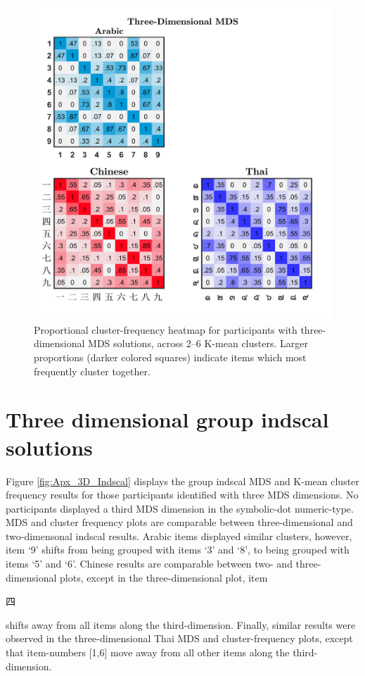 \begin{figure}[tbh]
\centering \includegraphics[scale = .7]{Figures/Appendix/AppD/3D_KM2clusterHeatmapCustom_wDots.jpg}
\caption{Proportional cluster-frequency heatmap for participants with three-dimensional MDS solutions, across 2--6 K-mean clusters. Larger proportions (darker colored squares) indicate items which most frequently cluster together.}
\label{fig:Apx_3D_MDScounts}
\end{figure}


\clearpage
\section{Three dimensional group indscal solutions}
\label{Appendix:Indscal 3D}

Figure \ref{fig:Apx_3D_Indscal} displays the group indscal MDS and K-mean cluster frequency results for those participants identified with three MDS dimensions. No participants displayed a third MDS dimension in the symbolic-dot numeric-type. MDS and cluster frequency plots are comparable between three-dimensional and two-dimensonal indscal results. Arabic items displayed similar clusters, however, item `9' shifts from being grouped with items `3' and `8', to being grouped with items `5' and `6'. Chinese results are comparable between two- and three-dimensional plots, except in the three-dimensional plot, item \begin{CJK}{UTF8}{gbsn} 四 \end{CJK} shifts away from all items along the third-dimension. Finally, similar results were observed in the three-dimensional Thai MDS and cluster-frequency plots, except that item-numbers [1,6] move away from all other items along the third-dimension.

